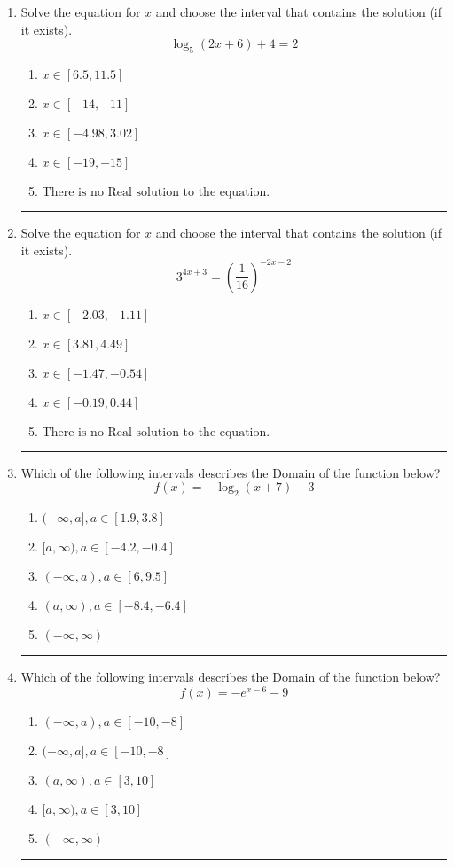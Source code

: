 \documentclass[14pt]{extbook}
\newcommand{\litem}[1]{\item#1\hspace*{-1cm}\rule{\textwidth}{0.4pt}}
\begin{document}
\begin{enumerate}
{\begin{enumerate}[label=\Alph*.]
\end{enumerate} }
\litem{
Solve the equation for $x$ and choose the interval that contains the solution (if it exists).\[ \log_{5}{(2x+6)}+4 = 2 \]\begin{enumerate}[label=\Alph*.]
\item \( x \in [6.5, 11.5] \)
\item \( x \in [-14, -11] \)
\item \( x \in [-4.98, 3.02] \)
\item \( x \in [-19, -15] \)
\item \( \text{There is no Real solution to the equation.} \)

\end{enumerate} }
\litem{
Solve the equation for $x$ and choose the interval that contains the solution (if it exists).\[ 3^{4x+3} = \left(\frac{1}{16}\right)^{-2x-2} \]\begin{enumerate}[label=\Alph*.]
\item \( x \in [-2.03, -1.11] \)
\item \( x \in [3.81, 4.49] \)
\item \( x \in [-1.47, -0.54] \)
\item \( x \in [-0.19, 0.44] \)
\item \( \text{There is no Real solution to the equation.} \)

\end{enumerate} }
\litem{
Which of the following intervals describes the Domain of the function below?\[ f(x) = -\log_2{(x+7)}-3 \]\begin{enumerate}[label=\Alph*.]
\item \( (-\infty, a], a \in [1.9, 3.8] \)
\item \( [a, \infty), a \in [-4.2, -0.4] \)
\item \( (-\infty, a), a \in [6, 9.5] \)
\item \( (a, \infty), a \in [-8.4, -6.4] \)
\item \( (-\infty, \infty) \)

\end{enumerate} }
\litem{
Which of the following intervals describes the Domain of the function below?\[ f(x) = -e^{x-6}-9 \]\begin{enumerate}[label=\Alph*.]
\item \( (-\infty, a), a \in [-10, -8] \)
\item \( (-\infty, a], a \in [-10, -8] \)
\item \( (a, \infty), a \in [3, 10] \)
\item \( [a, \infty), a \in [3, 10] \)
\item \( (-\infty, \infty) \)


\end{enumerate}}
\end{enumerate}
\end{document}
